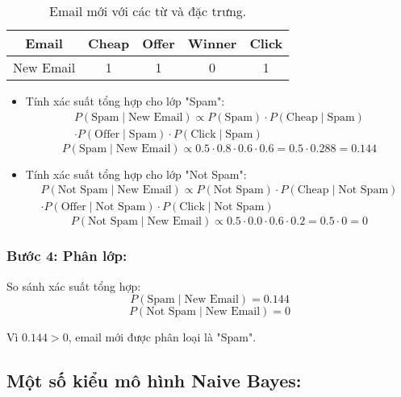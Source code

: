 \begin{table}[H]
\centering
\begin{tabular}{|c|c|c|c|c|}
\hline
Email & Cheap & Offer & Winner & Click \\
\hline
New Email & 1 & 1 & 0 & 1 \\
\hline
\end{tabular}
\caption{Email mới với các từ và đặc trưng.}
\end{table}

\begin{itemize}
    \item Tính xác suất tổng hợp cho lớp "Spam":
    \begin{multline*}
    P(\text{Spam} \mid \text{New Email}) \propto P(\text{Spam}) \cdot P(\text{Cheap} \mid \text{Spam}) \\
    \cdot P(\text{Offer} \mid \text{Spam}) \cdot P(\text{Click} \mid \text{Spam})
    \end{multline*}
    \[
    P(\text{Spam} \mid \text{New Email}) \propto 0.5 \cdot 0.8 \cdot 0.6 \cdot 0.6 = 0.5 \cdot 0.288 = 0.144
    \]

    \item Tính xác suất tổng hợp cho lớp "Not Spam":
    \begin{multline*}
    P(\text{Not Spam} \mid \text{New Email}) \propto P(\text{Not Spam}) \cdot P(\text{Cheap} \mid \text{Not Spam}) \\
    \cdot P(\text{Offer} \mid \text{Not Spam}) \cdot P(\text{Click} \mid \text{Not Spam})
    \end{multline*}
    \[
    P(\text{Not Spam} \mid \text{New Email}) \propto 0.5 \cdot 0.0 \cdot 0.6 \cdot 0.2 = 0.5 \cdot 0 = 0
    \]
\end{itemize}


\subsubsection{Bước 4: Phân lớp:}
So sánh xác suất tổng hợp:
\[
P(\text{Spam} \mid \text{New Email}) = 0.144
\]
\[
P(\text{Not Spam} \mid \text{New Email}) = 0
\]

Vì \(0.144 > 0\), email mới được phân loại là "Spam".
    
\subsection{Một số kiểu mô hình Naive Bayes:}

